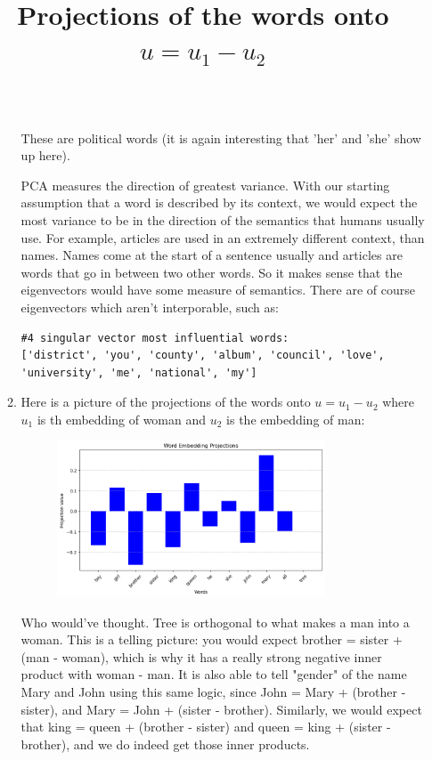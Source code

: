 \documentclass[12pt]{article}
\theoremstyle{definitionstyle}
\begin{document}
\begin{enumerate}[leftmargin=\labelsep]
\begin{enumerate}[label=\textbf{(\alph*)}]
\begin{lstlisting}
                \end{lstlisting}

                These are political words (it is again interesting that 'her' and 'she' show up here).

                PCA measures the direction of greatest variance. With our starting assumption that a word is described by its context, we would expect the most variance to be in the direction of the semantics that humans usually use. For example, articles are used in an extremely different context, than names. Names come at the start of a sentence usually and articles are words that go in between two other words. So it makes sense that the eigenvectors would have some measure of semantics. There are of course eigenvectors which aren't interporable, such as:
                \begin{lstlisting}
#4 singular vector most influential words: 
['district', 'you', 'county', 'album', 'council', 'love', 'university', 'me', 'national', 'my']
                \end{lstlisting}

                \item Here is a picture of the projections of the words onto $u = u_1-u_2$ where $u_1$ is th embedding of woman and $u_2$ is the embedding of man:
                \begin{figure}[H]
                    \centering
                    \includegraphics[width=0.8\textwidth]{man_woman_projs.png}
                    \title{Projections of the words onto $u = u_1-u_2$}
                \end{figure}
                Who would've thought. Tree is orthogonal to what makes a man into a woman. This is a telling picture: you would expect brother = sister + (man - woman), which is why it has a really strong negative inner product with woman - man. It is also able to tell "gender" of the name Mary and John using this same logic, since John = Mary + (brother - sister), and Mary = John + (sister - brother). Similarly, we would expect that king = queen + (brother - sister) and queen = king + (sister - brother), and we do indeed get those inner products. 
                

\end{enumerate}
\end{enumerate}
\end{document}
